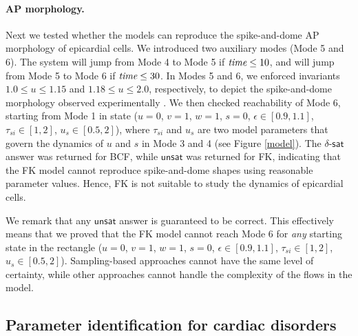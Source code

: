 \paragraph{AP morphology.}
Next we tested whether the models can reproduce the spike-and-dome AP morphology of epicardial cells. We introduced two auxiliary modes (Mode 5 and 6). The system will jump from Mode 4 to Mode 5 if $\text{\em time} \le 10$, and will jump from Mode 5 to Mode 6 if $\text{\em time} \le 30$. In Modes 5 and 6, we enforced invariants $1.0 \le u \le 1.15$ and $1.18 \le u \le 2.0$, respectively, to depict the spike-and-dome morphology observed experimentally \cite{nabauer96}. We then checked reachability of Mode 6, starting from Mode 1 in state ($u = 0$, $v = 1$, $w = 1$, $s = 0$, $\epsilon \in [0.9,1.1]$, $\tau_{si} \in [1,2]$, $u_s \in [0.5,2]$),
where $\tau_{si}$ and $u_s$ are two model parameters that govern the dynamics of $u$ and $s$ in
Mode 3 and 4 (see Figure \ref{model}).
The $\delta$-$\mathsf{sat}$ answer
was returned for BCF, while $\mathsf{unsat}$ was returned for FK, indicating that the FK model cannot reproduce spike-and-dome shapes using reasonable parameter values. Hence, FK is not suitable to study the dynamics of epicardial cells.

We remark that any $\mathsf{unsat}$ answer is guaranteed to be correct. This effectively
means that we proved that the FK model cannot reach Mode 6 for {\em any} starting state in the
rectangle ($u = 0$, $v = 1$, $w = 1$, $s = 0$, $\epsilon \in [0.9,1.1]$, $\tau_{si} \in [1,2]$,
$u_s \in [0.5,2]$). Sampling-based approaches cannot have the same level of certainty, while other
approaches cannot handle the complexity of the flows in the model.


\subsection{Parameter identification for cardiac disorders}

